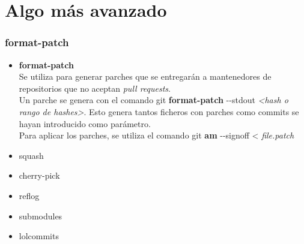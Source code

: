 \section{Algo más avanzado}
\frame
{
\frametitle{format-patch}
\begin{itemize}
 \item \textbf{format-patch}\\ \indent
 Se utiliza para generar parches que se entregarán a mantenedores de repositorios que no aceptan \textit{pull requests}.\\
 Un parche se genera con el comando git \textbf{format-patch} -{}-stdout \textit{<hash o rango de hashes>}. Esto genera tantos ficheros con parches como commits se hayan introducido como parámetro.\\
 Para aplicar los parches, se utiliza el comando git \textbf{am} -{}-signoff < \textit{file.patch}

 \item squash
 \item cherry-pick
 \item reflog 
 \item submodules
 \item lolcommits 
\end{itemize}
}
